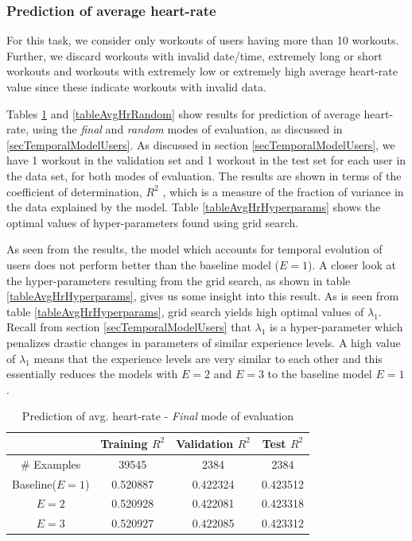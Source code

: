 \documentclass{acm_proc_article-sp}
\begin{document}
\subsubsection{Prediction of average heart-rate}

For this task, we consider only workouts of users having more than 10 workouts. Further, we discard workouts with invalid date/time, extremely long or short workouts and workouts with extremely low or extremely high average heart-rate value since these indicate workouts with invalid data.

Tables \ref{tableAvgHrFinal} and \ref{tableAvgHrRandom} show results for prediction of average heart-rate, using the  \emph{final} and \emph{random} modes of evaluation, as discussed in \ref{secTemporalModelUsers}. As discussed in section \ref{secTemporalModelUsers}, we have 1 workout in the validation set and 1 workout in the test set for each user in the data set, for both modes of evaluation. The results are shown in terms of the coefficient of determination, $R^2$ \cite{r2Wiki}, which is a measure of the fraction of variance in the data explained by the model. Table \ref{tableAvgHrHyperparams} shows the optimal values of hyper-parameters found using grid search.

As seen from the results, the model which accounts for temporal evolution of users does not perform better than the baseline model ($E = 1$). A closer look at the hyper-parameters resulting from the grid search, as shown in table \ref{tableAvgHrHyperparams}, gives us some insight into this result. As is seen from table \ref{tableAvgHrHyperparams}, grid search yields high optimal values of $\lambda_1$. Recall from section \ref{secTemporalModelUsers} that $\lambda_1$ is a hyper-parameter which penalizes drastic changes in parameters of similar experience levels. A high value of $\lambda_1$ means that the experience levels are very similar to each other and this essentially reduces the models with $E = 2$ and $E = 3$ to the baseline model $E = 1$.

\begin{table}[h]
\centering
\begin{tabular}{|c|c|c|c|} \hline
& Training $R^2$ & Validation $R^2$ & Test $R^2$ \\ \hline
\# Examples & 39545 & 2384 & 2384  \\ \hline
Baseline($E = 1$)& 0.520887 & 0.422324 & 0.423512 \\ \hline
$E = 2$ & 0.520928 & 0.422081 & 0.423318 \\ \hline
$E = 3$ & 0.520927 & 0.422085 & 0.423312 \\ \hline
\end{tabular}
\caption{Prediction of avg. heart-rate - \emph{Final} mode of evaluation }
\label{tableAvgHrFinal}
\end{table}
\end{document}
